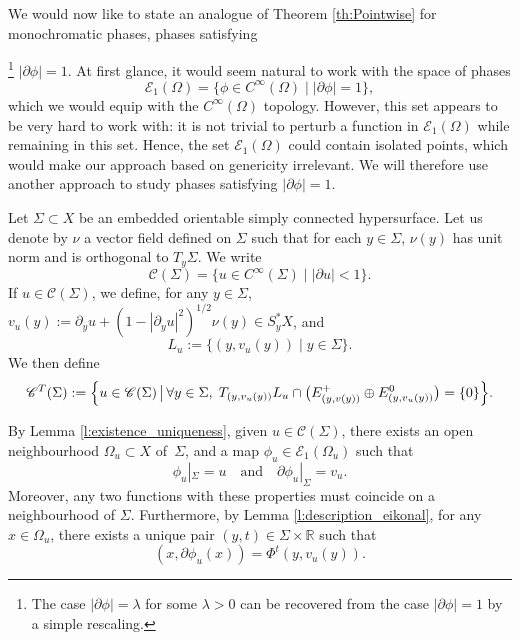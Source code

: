 \documentclass[10pt]{amsart}
\let\mathcal\mathscr
\let\sep\mid
\theoremstyle{plain}
\theoremstyle{definition}
\newcommand{\R}{\mathbb{R}}
\def\calC{\mathcal{C}}
\begin{document}
We would now like to state an analogue of Theorem \ref{th:Pointwise} for monochromatic phases, \ie phases satisfying{\footnote{The case $|\partial \phi|=\lambda$ for some $\lambda>0$ can be recovered from the case $|\partial \phi|=1$ by a simple rescaling.} $|\partial \phi|=1$. At first glance, it would seem natural to work with the space of phases
\[
\mathcal{E}_{1}(\Omega) = \{ \phi\in C^\infty(\Omega)\sep |\partial \phi |=1 \},
\]
which we would equip with the $C^\infty(\Omega)$ topology. However, this set appears to be very hard to work with: it is not trivial to perturb a function in $\mathcal{E}_{1}(\Omega)$ while remaining in this set. Hence, the set $\mathcal{E}_{1}(\Omega)$ could contain isolated points, which would make our approach based on genericity irrelevant. We will therefore use another approach to study phases satisfying $|\partial \phi|=1$.

Let $\Sigma\subset X$ be an embedded orientable simply connected hypersurface. Let us denote by $\nu$ a vector field defined on $\Sigma$ such that for each $y\in\Sigma$, $\nu(y)$ has unit norm and is orthogonal to $T_y\Sigma$. We write
\begin{equation}\label{eq:calC_def}
\calC(\Sigma)=\{u\in C^\infty(\Sigma)\sep |\partial u|<1\}.
\end{equation}
If $u\in \mathcal{C}(\Sigma)$, we define, for any $y\in \Sigma$, $v_u(y):=\partial _yu+(1-|\partial _yu|^2)^{1/2}\nu(y)\in S^*_y X$, and
\[
L_u:= \{ (y, v_u(y))\sep y\in \Sigma\}.
\]
We then define
\begin{equation}\label{eq:calC_trans}
\mathcal{C}^T(\Sigma) := \Bigl\{u \in \mathcal{C}(\Sigma)\, \big|\, \forall y \in \Sigma,\; T_{(y, v_u(y))}L_u \cap \bigl(E^+_{(y, v(y))} \oplus E^0_{(y, v_u(y))}\bigr) = \{0\} \Bigr\}.
\end{equation}

By Lemma \ref{l:existence_uniqueness}, given $u\in \mathcal{C}(\Sigma)$, there exists an open neighbourhood $\Omega_u\subset X$ of~$\Sigma$, and a map $\phi_u\in \mathcal{E}_1(\Omega_u)$ such that
\begin{equation}\label{eq:phi_from_u}
\phi_u|_\Sigma=u\quad\text{and}\quad\partial\phi_u|_\Sigma=v_u.
\end{equation}
Moreover, any two functions with these properties must coincide on a neighbourhood of $\Sigma$. Furthermore, by Lemma \ref{l:description_eikonal}, for any $x\in \Omega_u$, there exists a unique pair $(y,t)\in\Sigma \times \R$ such that\vspace*{-3pt}\enlargethispage{.5\baselineskip}%
\begin{equation}\label{eq:GradientsAreCool}
(x, \partial \phi_u(x)) = \Phi^t(y, v_u(y)).
\end{equation}

}
\end{document}
